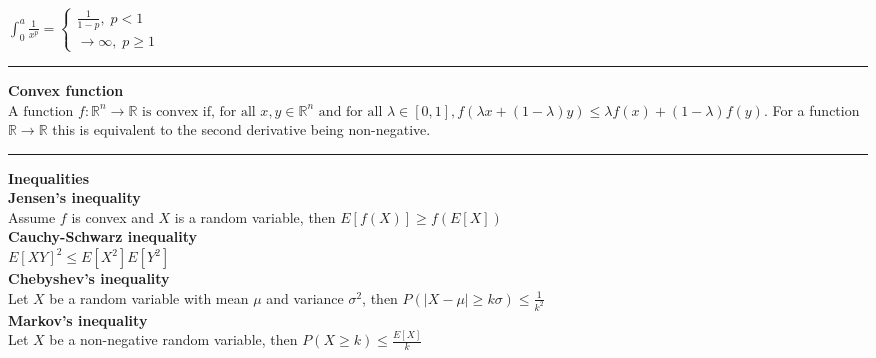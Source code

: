 \documentclass[10pt]{article} %
\begin{document}
\begin{multicols}{4}
{\begin{flushleft}
            \(
            \int_0^a \frac{1}{x^p} = \begin{cases}
                \frac{1}{1-p},\; p<1 \\
                \to \infty ,\; p \geq 1
            \end{cases}
            \)
            \vspace{0.1cm}
            \hrule
            \vspace{0.1cm}
            \textbf{Convex function}\\
            \(
            \text{A function } f: \mathbb{R}^n \to \mathbb{R} \text{ is convex if, for all } x, y \in \mathbb{R}^n \text{ and for all } \lambda \in [0, 1],
            f(\lambda x + (1 - \lambda)y) \leq \lambda f(x) + (1 - \lambda)f(y).
            \)
            For a function \(\mathbb{R} \to \mathbb{R}\) this is equivalent to the second derivative being non-negative.
            \vspace{0.1cm}
            \hrule
            \vspace{0.1cm}
            {\large \textbf{Inequalities}}\\
            \textbf{Jensen's inequality}\\
            Assume \(f\) is convex and \(X\) is a random variable, then
            \(
            E[f(X)] \geq f(E[X])
            \)\\
            \textbf{Cauchy-Schwarz inequality}\\
            \(
            E[XY]^2 \leq E[X^2]E[Y^2]
            \)\\
            \textbf{Chebyshev's inequality}\\
            Let \(X\) be a random variable with mean \(\mu\) and variance \(\sigma^2\), then
            \(
            P(|X-\mu| \geq k\sigma) \leq \frac{1}{k^2}
            \)\\
            \textbf{Markov's inequality}\\
            Let \(X\) be a non-negative random variable, then
            \(
            P(X \geq k) \leq \frac{E[X]}{k}
            \)\\

\end{flushleft}}
\end{multicols}
\end{document}
